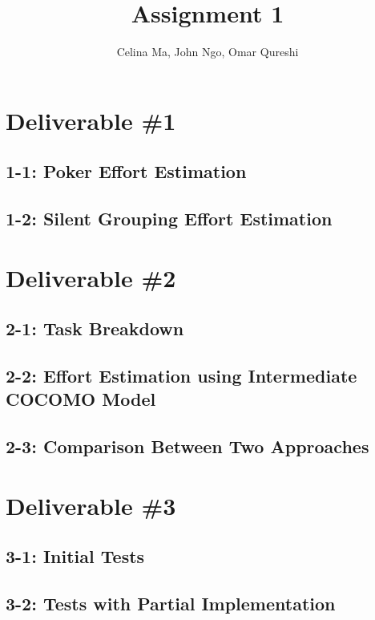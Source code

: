 \documentclass[11pt,a4paper]{article}
\title{\vspace{-2.0cm} Assignment 1}
\author{Celina Ma, John Ngo, Omar Qureshi}
\begin{document}
\maketitle
\def\textfraction{.01}
\def\topfraction{.99}
\section*{Deliverable \#1}

\subsection*{1-1: Poker Effort Estimation}

\subsection*{1-2: Silent Grouping Effort Estimation}

\newpage


\section*{Deliverable \#2}

\subsection*{2-1: Task Breakdown}

\subsection*{2-2: Effort Estimation using Intermediate COCOMO Model}

\subsection*{2-3: Comparison Between Two Approaches}

\newpage

\section*{Deliverable \#3}

\subsection*{3-1: Initial Tests}

\subsection*{3-2: Tests with Partial Implementation}
\end{document}
